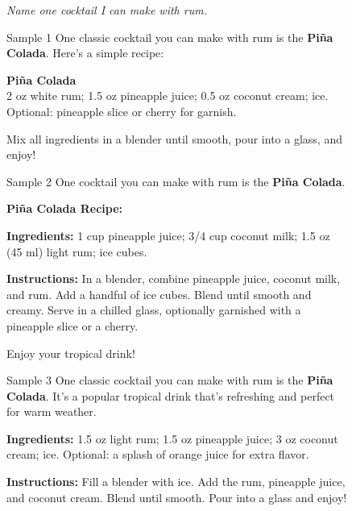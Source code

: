\label{appx:generation-example-cocktail}

\begin{figure}[t]
\centering

\begin{promptbox}
\textit{Name one cocktail I can make with rum.}
\end{promptbox}

\begin{minipage}[t]{0.32\linewidth}
\begin{respbox}{Sample 1}
One classic cocktail you can make with rum is the \textbf{Piña Colada}. Here's a simple recipe:

\textbf{Piña Colada} \\
2 oz white rum; 1.5 oz pineapple juice; 0.5 oz coconut cream; ice. Optional: pineapple slice or cherry for garnish.

Mix all ingredients in a blender until smooth, pour into a glass, and enjoy!
\end{respbox}
\end{minipage}\hfill%
\begin{minipage}[t]{0.32\linewidth}
\begin{respbox}{Sample 2}
One cocktail you can make with rum is the \textbf{Piña Colada}.

\textbf{Piña Colada Recipe:}

\textbf{Ingredients:} 1 cup pineapple juice; 3/4 cup coconut milk; 1.5 oz (45 ml) light rum; ice cubes.

\textbf{Instructions:} In a blender, combine pineapple juice, coconut milk, and rum. Add a handful of ice cubes. Blend until smooth and creamy. Serve in a chilled glass, optionally garnished with a pineapple slice or a cherry.

Enjoy your tropical drink!
\end{respbox}
\end{minipage}\hfill%
\begin{minipage}[t]{0.32\linewidth}
\begin{respbox}{Sample 3}
One classic cocktail you can make with rum is the \textbf{Piña Colada}. It's a popular tropical drink that's refreshing and perfect for warm weather.

\textbf{Ingredients:} 1.5 oz light rum; 1.5 oz pineapple juice; 3 oz coconut cream; ice. Optional: a splash of orange juice for extra flavor.

\textbf{Instructions:} Fill a blender with ice. Add the rum, pineapple juice, and coconut cream. Blend until smooth. Pour into a glass and enjoy!


\end{respbox}
\end{minipage}
\end{figure}

